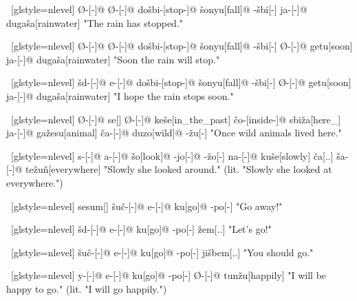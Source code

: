 \ex~[glstyle=nlevel]
\begingl
\glpreamble {}
\endpreamble
Ø-[{\Ind}-]@
Ø-[{\Pfv}-]@
do\v{s}bi-[stop-]@
\v{s}onyu[fall]@
-\v{s}bi[-{\Inan}]
ja-[{\Nom}-]@
duga\v{s}a[rainwater]
\glft "The rain has stopped."
\endgl
\xe

\ex~[glstyle=nlevel]
\begingl
\glpreamble {}
\endpreamble
Ø-[{\Ind}-]@
Ø-[{\Pfv}-]@
do\v{s}bi-[stop-]@
\v{s}onyu[fall]@
-\v{s}bi[-{\Inan}]
Ø-[{\Pfv}-]@
getu[soon]
ja-[{\Nom}-]@
duga\v{s}a[rainwater]
\glft "Soon the rain will stop."
\endgl
\xe

\ex~[glstyle=nlevel]
\begingl
\glpreamble {}
\endpreamble
\v{s}d-[{\Opt}-]@
e-[{\Pfv}-]@
do\v{s}bi-[stop-]@
\v{s}onyu[fall]@
-\v{s}bi[-{\Inan}]
Ø-[{\Pfv}-]@
getu[soon]
ja-[{\Nom}-]@
duga\v{s}a[rainwater]
\glft "I hope the rain stops soon."
\endgl
\xe

\ex~[glstyle=nlevel]
\begingl
\glpreamble {}
\endpreamble
Ø-[{\Ind}-]@
se[{\Cop}]
Ø-[{\Pfv}-]@
ke\v{s}e[in\_the\_past]
\v{c}o-[inside-]@
sbi\v{z}a[here\_]
ja-[{\Nom}-]@
ga\v{z}esu[animal]
\v{c}a-[{\Nom}-]@
duzo[wild]@
-\v{z}u[-{\An}]
\glft "Once wild animals lived here."
\endgl
\xe

\ex~[glstyle=nlevel]
\begingl
\glpreamble {}
\endpreamble
s-[{\Ind}-]@
a-[{\Prog}-]@
\v{s}o[look]@
-jo[-{\Hg}]@
-\v{z}o[-{\Inan}]
na-[{\Prog}-]@
ku\v{s}e[slowly]
\v{c}a[{\T}.{\Hg}.{\Erg}]
\v{s}a-[{\Acc}-]@
te\v{z}uñ[everywhere]
\glft "Slowly she looked around." (lit. "Slowly she looked at everywhere.")
\endgl
\xe

\ex~[glstyle=nlevel]
\begingl
\glpreamble {}
\endpreamble
sesum[\Imp]
\v{s}u\v{c}-[{\Deo}-]@
e-[{\Pfv}-]@
ku[go]@
-po[-{\Hg}]
\glft "Go away!"
\endgl
\xe

\ex~[glstyle=nlevel]
\begingl
\glpreamble {}
\endpreamble
\v{s}d-[{\Opt}-]@
e-[{\Pfv}-]@
ku[go]@
-po[-{\Hg}]
\v{z}em[{\Fin}.{\Hg}.{\Nom}]
\glft "Let's go!"
\endgl
\xe

\ex~[glstyle=nlevel]
\begingl
\glpreamble {}
\endpreamble
\v{s}u\v{c}-[{\Deo}-]@
e-[{\Pfv}-]@
ku[go]@
-po[-{\Hg}]
ji\v{s}bem[{\Spol}.{\Hg}.{\Nom}]
\glft "You should go."
\endgl
\xe

\ex~[glstyle=nlevel]
\begingl
\glpreamble {}
\endpreamble
y-[{\Subj}-]@
e-[{\Pfv}-]@
ku[go]@
-po[-{\Hg}]
Ø-[{\Pfv}-]@
tun\v{z}u[happily]
\glft "I will be happy to go." (lit. "I will go happily.")
\endgl
\xe

